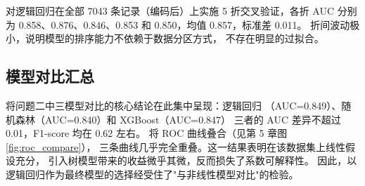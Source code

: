 对逻辑回归在全部 7043 条记录（编码后）上实施 5 折交叉验证，各折 AUC 分别为
0.858、0.876、0.846、0.853 和 0.850，均值 0.857，标准差 0.011。
折间波动极小，说明模型的排序能力不依赖于数据分区方式，
不存在明显的过拟合。

\subsection{模型对比汇总}

将问题二中三模型对比的核心结论在此集中呈现：逻辑回归
（AUC=0.849）、随机森林（AUC=0.840）和 XGBoost（AUC=0.847）
三者的 AUC 差异不超过 0.01，F1-score 均在 0.62 左右。
将 ROC 曲线叠合（见第 5 章图 \ref{fig:roc_compare}），
三条曲线几乎完全重叠。这一结果表明在该数据集上线性假设充分，
引入树模型带来的收益微乎其微，反而损失了系数可解释性。
因此，以逻辑回归作为最终模型的选择经受住了"与非线性模型对比"的检验。

